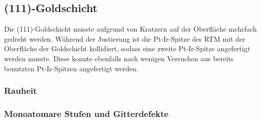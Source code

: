 \subsection{(111)-Goldschicht}
Die (111)-Goldschicht musste aufgrund von Kratzern auf der Oberfläche mehrfach gedreht werden. Während der Justierung ist die Pt-Ir-Spitze des RTM mit der Oberfläche der Goldschicht kollidiert, sodass eine zweite Pt-Ir-Spitze angefertigt werden musste. Diese konnte ebenfalls nach wenigen Versuchen aus bereits benutzten Pt-Ir-Spitzen angefertigt werden.
\subsubsection{Rauheit}
\subsubsection{Monoatomare Stufen und Gitterdefekte}
